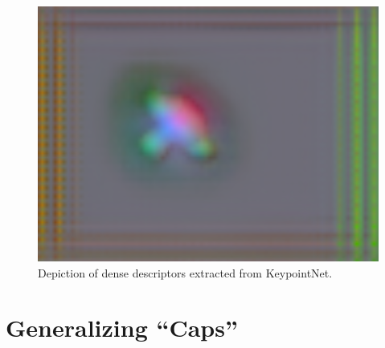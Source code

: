 \begin{figure}[htb]
    \centering
    \caption{Depiction of dense descriptors extracted from KeypointNet.}
    \label{fig:descriptors_from_keypointnet}
    \includegraphics[scale=0.22]{images/don/don-d16-resnet50-nc256-c.png}
\end{figure}





















































\section{Generalizing ``Caps''}

